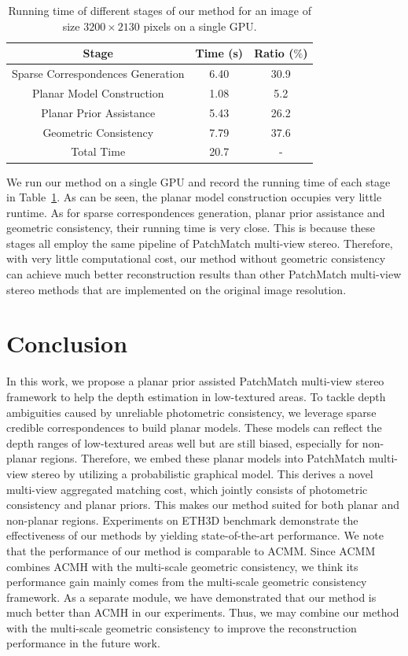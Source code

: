 \documentclass[letterpaper]{article} %
\begin{document}
\begin{table}
	\caption{Running time of different stages of our method for an image of size $3200\times2130$ pixels on a single GPU.}
	\centering
	\footnotesize
	\begin{tabular}{ccc}
		\toprule
		Stage & Time (s) & Ratio ($\%$) \\
		\midrule
		Sparse Correspondences Generation & 6.40 & 30.9 \\
		Planar Model Construction & 1.08 & 5.2 \\
		Planar Prior Assistance & 5.43 & 26.2 \\
		Geometric Consistency & 7.79 & 37.6 \\
		\midrule
		Total Time & 20.7 & - \\
		\bottomrule
	\end{tabular}
\label{tab:Time}
\end{table}

 We run our method on a single GPU and record the running time of each stage in Table~\ref{tab:Time}. As can be seen, the planar model construction occupies very little runtime. As for sparse correspondences generation, planar prior assistance and geometric consistency, their running time is very close. This is because these stages all employ the same pipeline of PatchMatch multi-view stereo. Therefore, with very little computational cost, our method without geometric consistency can achieve much better reconstruction results than other PatchMatch multi-view stereo methods that are implemented on the original image resolution.

\section{Conclusion}

In this work, we propose a planar prior assisted PatchMatch multi-view stereo framework to help the depth estimation in low-textured areas. To tackle depth ambiguities caused by unreliable photometric consistency, we leverage sparse credible correspondences to build planar models. These models can reflect the depth ranges of low-textured areas well but are still biased, especially for non-planar regions. Therefore, we embed these planar models into PatchMatch multi-view stereo by utilizing a probabilistic graphical model. This derives a novel multi-view aggregated matching cost, which jointly consists of photometric consistency and planar priors. This makes our method suited for both planar and non-planar regions. Experiments on ETH3D benchmark demonstrate the effectiveness of our methods by yielding state-of-the-art performance. We note that the performance of our method is comparable to ACMM. Since ACMM combines ACMH with the multi-scale geometric consistency, we think its performance gain mainly comes from the multi-scale geometric consistency framework. As a separate module, we have demonstrated that our method is much better than ACMH in our experiments. Thus, we may combine our method with the multi-scale geometric consistency to improve the reconstruction performance in the future work.
\end{document}
